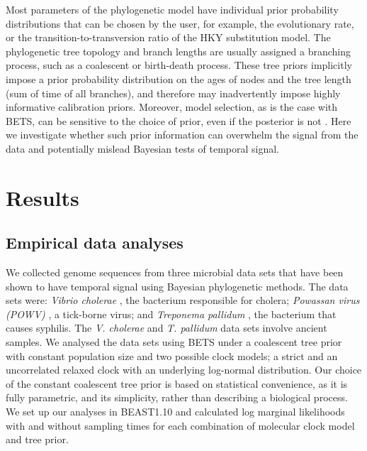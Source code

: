 \documentclass[10pt,letterpaper]{article}
\begin{document}
Most parameters of the phylogenetic model have individual prior probability distributions that can be chosen by the user, for example, the evolutionary rate, or the transition-to-transversion ratio of the HKY substitution model. The phylogenetic tree topology and branch lengths are usually assigned a branching process, such as a coalescent or birth-death process. These tree priors implicitly impose a prior probability distribution on the ages of nodes and the tree length (sum of time of all branches), and therefore may inadvertently impose highly informative calibration priors. Moreover, model selection, as is the case with BETS, can be sensitive to the choice of prior, even if the posterior is not \cite{gelman1995avoiding, gelman2014bayesian}. Here we investigate whether such prior information can overwhelm the signal from the data and potentially mislead Bayesian tests of temporal signal.

\section*{Results}
\subsection*{Empirical data analyses}
We collected genome sequences from three microbial data sets that have been shown to have temporal signal using Bayesian phylogenetic methods. The data sets were: \textit{Vibrio cholerae} \cite{devault2014second}, the bacterium responsible for cholera; \textit{Powassan virus (POWV)} \cite{majander2020ancient}, a tick-borne virus; and \textit{Treponema pallidum} \cite{vogels2023phylogeographic}, the bacterium that causes syphilis. The \textit{V. cholerae} and \textit{T. pallidum} data sets involve ancient samples. We analysed the data sets using BETS under a coalescent tree prior with constant population size and two possible clock models; a strict and an uncorrelated relaxed clock with an underlying log-normal distribution. Our choice of the constant coalescent tree prior is based on statistical convenience, as it is fully parametric, and its simplicity, rather than describing a biological process. We set up our analyses in BEAST1.10 \cite{suchard2018bayesian} and calculated log marginal likelihoods with and without sampling times for each combination of molecular clock model and tree prior. 
\end{document}
